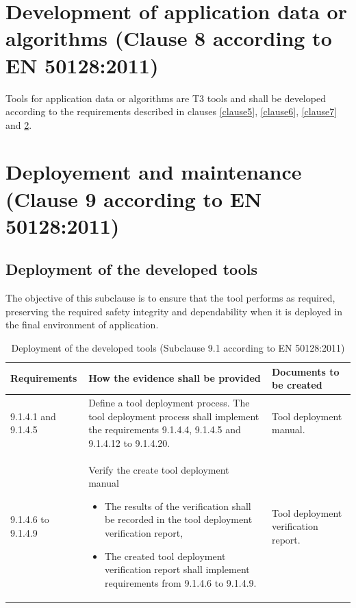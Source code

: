 \documentclass{template/openetcs_report}
\begin{document}
\section{Development of application data or algorithms (Clause 8 according to EN 50128:2011)}
Tools for application data or algorithms are T3 tools and shall be developed according to the requirements described in clauses \ref{clause5}, \ref{clause6}, \ref{clause7} and \ref{clause9}.
\linebreak
\linebreak


\section{Deployement and maintenance (Clause 9 according to EN 50128:2011)}
\label{clause9}
\subsection{Deployment of the developed tools}
\begin{flushleft}
The objective of this subclause is to ensure that the tool performs as required, preserving the required safety integrity and dependability when it is deployed in the final environment of application.
\end{flushleft}
{\footnotesize\sffamily\centering
\begin{longtable}{|p{2cm}|p{9cm}|p{3cm}|}
\caption{Deployment of the developed tools (Subclause 9.1 according to EN 50128:2011)}\\
\hline
\bfseries Requirements & \bfseries How the evidence shall be provided & \bfseries Documents to be created\\
\hline
\hline
\endhead
\hline
\endfoot

9.1.4.1 and 9.1.4.5 & Define a tool deployment process.
The tool deployment process shall implement the requirements 9.1.4.4, 9.1.4.5 and 9.1.4.12 to 9.1.4.20.
& Tool deployment manual.\\ 
\hline
9.1.4.6 to 9.1.4.9 & Verify the create tool deployment manual
\begin{itemize}\itemsep=0pt
  \item The results of the verification shall be recorded in the tool deployment verification report,
  \item The created tool deployment verification report shall implement requirements from 9.1.4.6 to 9.1.4.9. 
\end{itemize}
& Tool deployment verification report.\\ 
\hline
\end{longtable}}
\end{document}
